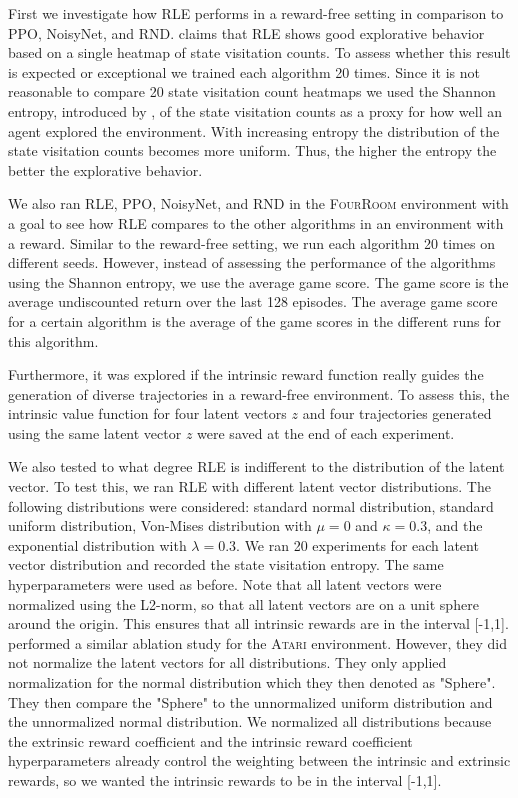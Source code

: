 \documentclass[10pt]{article} %
\begin{document}
First we investigate how RLE performs in a reward-free setting in comparison to PPO, NoisyNet, and RND. \cite{rle-paper} claims that RLE shows good explorative behavior based on a single heatmap of state visitation counts. To assess whether this result is expected or exceptional we trained each algorithm 20 times. Since it is not reasonable to compare 20 state visitation count heatmaps we used the Shannon entropy, introduced by \cite{shannon-entropy-paper}, of the state visitation counts as a proxy for how well an agent explored the environment. With increasing entropy the distribution of the state visitation counts becomes more uniform. Thus, the higher the entropy the better the explorative behavior. 

We also ran RLE, PPO, NoisyNet, and RND in the \textsc{FourRoom} environment with a goal to see how RLE compares to the other algorithms in an environment with a reward. Similar to the reward-free setting, we run each algorithm 20 times on different seeds. However, instead of assessing the performance of the algorithms using the Shannon entropy, we use the average game score. The game score is the average undiscounted return over the last 128 episodes. The average game score for a certain algorithm is the average of the game scores in the different runs for this algorithm.

Furthermore, it was explored if the intrinsic reward function really guides the generation of diverse trajectories in a reward-free environment. To assess this, the intrinsic value function for four latent vectors $z$ and four trajectories generated using the same latent vector $z$ were saved at the end of each experiment. 

We also tested to what degree RLE is indifferent to the distribution of the latent vector. To test this, we ran RLE with different latent vector distributions. The following distributions were considered: standard normal distribution, standard uniform distribution, Von-Mises distribution with $\mu=0$ and $\kappa=0.3$, and the exponential distribution with $\lambda=0.3$. We ran 20 experiments for each latent vector distribution and recorded the state visitation entropy. The same hyperparameters were used as before. Note that all latent vectors were normalized using the L2-norm, so that all latent vectors are on a unit sphere around the origin. This ensures that all intrinsic rewards are in the interval [-1,1]. \cite{rle-paper} performed a similar ablation study for the \textsc{Atari} environment. However, they did not normalize the latent vectors for all distributions. They only applied normalization for the normal distribution which they then denoted as "Sphere". They then compare the "Sphere" to the unnormalized uniform distribution and the unnormalized normal distribution. We normalized all distributions because the extrinsic reward coefficient and the intrinsic reward coefficient hyperparameters already control the weighting between the intrinsic and extrinsic rewards, so we wanted the intrinsic rewards to be in the interval [-1,1].
\end{document}
